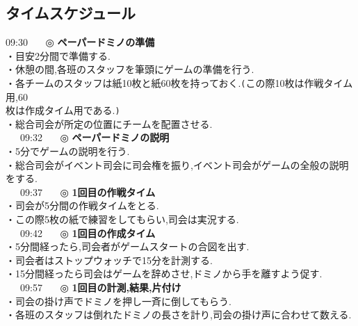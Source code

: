 \documentclass[a4j]{jarticle}
\begin{document}
\subsection{タイムスケジュール}
09:30 \ \ \ ◎ \textbf{ペーパードミノの準備}\\
\hspace{15mm}・目安2分間で準備する.\\
\hspace{15mm}・休憩の間,各班のスタッフを筆頭にゲームの準備を行う.\\
\hspace{15mm}・各チームのスタッフは紙10枚と紙60枚を持っておく.\verb+(+この際10枚は作戦タイム用,60\\
\hspace{15mm}枚は作成タイム用である.\verb+)+\\
\hspace{15mm}・総合司会が所定の位置にチームを配置させる.\\
\ \ \ 09:32 \ \ \ ◎ \textbf{ペーパードミノの説明}\\
\hspace{15mm}・5分でゲームの説明を行う.\\
\hspace{15mm}・総合司会がイベント司会に司会権を振り,イベント司会がゲームの全般の説明をする.\\
\ \ \ 09:37 \ \ \ ◎ \textbf{1回目の作戦タイム}\\
\hspace{15mm}・司会が5分間の作戦タイムをとる.\\
\hspace{15mm}・この際5枚の紙で練習をしてもらい,司会は実況する.\\
\ \ \ 09:42 \ \ \ ◎ \textbf{1回目の作成タイム}\\
\hspace{15mm}・5分間経ったら,司会者がゲームスタートの合図を出す.\\
\hspace{15mm}・司会者はストップウォッチで15分を計測する.\\
\hspace{15mm}・15分間経ったら司会はゲームを辞めさせ,ドミノから手を離すよう促す.\\
\ \ \ 09:57 \ \ \ ◎ \textbf{1回目の計測,結果,片付け}\\
\hspace{15mm}・司会の掛け声でドミノを押し一斉に倒してもらう.\\
\hspace{15mm}・各班のスタッフは倒れたドミノの長さを計り,司会の掛け声に合わせて数える.\\
\end{document}
